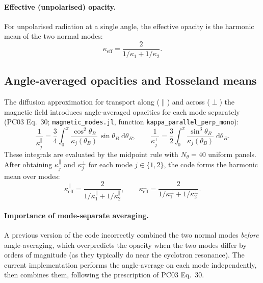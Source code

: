 \paragraph{Effective (unpolarised) opacity.}
For unpolarised radiation at a single angle, the effective opacity is the
harmonic mean of the two normal modes:
%
\begin{equation}
\label{eq:kappa_eff}
\kappa_{\mathrm{eff}} = \frac{2}{1/\kappa_1 + 1/\kappa_2}.
\end{equation}


\subsection{Angle-averaged opacities and Rosseland means}
\label{sec:opacity:rosseland_mag}

\noindent
The diffusion approximation for transport along ($\parallel$) and across
($\perp$) the magnetic field introduces angle-averaged opacities for each
mode separately (PC03 Eq.~30; \texttt{magnetic\_modes.jl}, function
\texttt{kappa\_parallel\_perp\_mono}):
%
\begin{equation}
\label{eq:angle_avg}
\frac{1}{\kappa_j^\parallel}
  = \frac{3}{4}\int_0^\pi
    \frac{\cos^2\theta_B}{\kappa_j(\theta_B)}\,
    \sin\theta_B\;\mathrm{d}\theta_B,
\qquad
\frac{1}{\kappa_j^\perp}
  = \frac{3}{2}\int_0^\pi
    \frac{\sin^3\theta_B}{\kappa_j(\theta_B)}\;
    \mathrm{d}\theta_B.
\end{equation}
%
These integrals are evaluated by the midpoint rule with $N_\theta = 40$
uniform panels.  After obtaining $\kappa_j^\parallel$ and $\kappa_j^\perp$
for each mode $j\in\{1,2\}$, the code forms the harmonic mean over modes:
%
\begin{equation}
\label{eq:harmonic_modes}
\kappa_{\mathrm{eff}}^\parallel
  = \frac{2}{1/\kappa_1^\parallel + 1/\kappa_2^\parallel},
\qquad
\kappa_{\mathrm{eff}}^\perp
  = \frac{2}{1/\kappa_1^\perp + 1/\kappa_2^\perp}.
\end{equation}

\paragraph{Importance of mode-separate averaging.}
A previous version of the code incorrectly combined the two normal modes
\emph{before} angle-averaging, which overpredicts the opacity when the two
modes differ by orders of magnitude (as they typically do near the
cyclotron resonance).  The current implementation performs the
angle-average on each mode independently, then combines them, following
the prescription of PC03 Eq.~30.

